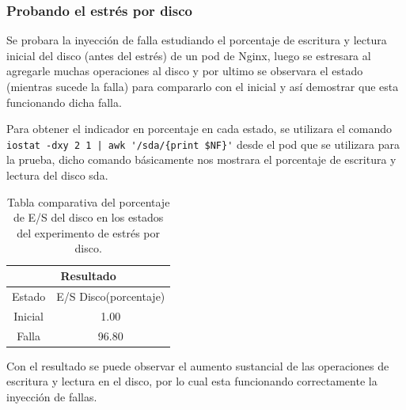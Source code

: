 \subsubsection{Probando el estrés por disco}


\par Se probara la inyección de falla estudiando el porcentaje de escritura y lectura inicial del disco (antes del estrés) de un pod de Nginx, luego se estresara al agregarle muchas operaciones al disco y por ultimo se observara el estado (mientras sucede la falla) para compararlo con el inicial y así demostrar que esta funcionando dicha falla.\\

\par Para obtener el indicador en porcentaje en cada estado, se utilizara el comando \\ \verb+iostat -dxy 2 1 | awk '/sda/{print $NF}'+ desde el pod que se utilizara para la prueba, dicho comando básicamente nos mostrara el porcentaje de escritura y lectura del disco sda.\\


\begin{table}[ht!]
\begin{center}
\begin{tabular}{ |c|c| } 
 \hline
 \multicolumn{2}{|c|}{Resultado} \\
 \hline
 \hline
 Estado & E/S Disco(porcentaje)\\
 \hline
 Inicial & 1.00\\
 Falla & 96.80\\
 \hline
\end{tabular}
\end{center}
\caption{Tabla comparativa del porcentaje de E/S del disco en los estados del experimento de estrés por disco.}
\label{tab:tabla44}
\end{table}

\par Con el resultado se puede observar el aumento sustancial de las operaciones de escritura y lectura en el disco, por lo cual esta funcionando correctamente la inyección de fallas.\\

